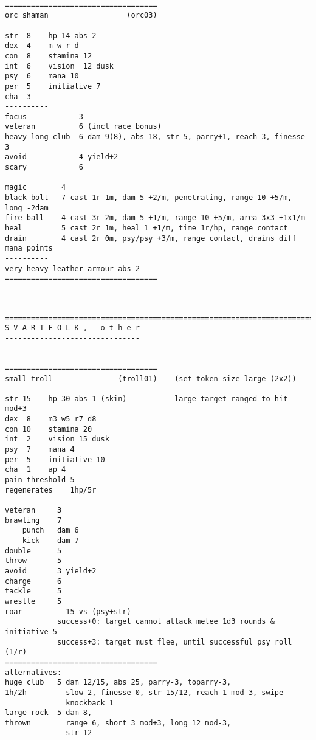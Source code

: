\

\goodbreak \begin{samepage} \small \begin{verbatim}
===================================
orc shaman                  (orc03)
-----------------------------------
str  8    hp 14 abs 2
dex  4    m w r d
con  8    stamina 12
int  6    vision  12 dusk
psy  6    mana 10
per  5    initiative 7
cha  3
----------
focus            3
veteran          6 (incl race bonus)
heavy long club  6 dam 9(8), abs 18, str 5, parry+1, reach-3, finesse-3
avoid            4 yield+2
scary            6
----------
magic        4
black bolt   7 cast 1r 1m, dam 5 +2/m, penetrating, range 10 +5/m, long -2dam
fire ball    4 cast 3r 2m, dam 5 +1/m, range 10 +5/m, area 3x3 +1x1/m
heal         5 cast 2r 1m, heal 1 +1/m, time 1r/hp, range contact
drain        4 cast 2r 0m, psy/psy +3/m, range contact, drains diff mana points
----------
very heavy leather armour abs 2
===================================
\end{verbatim} \normalsize \end{samepage}

\





\goodbreak
{}

\goodbreak \begin{samepage} \small \begin{verbatim}
================================================================================
S V A R T F O L K ,   o t h e r
-------------------------------


===================================
small troll               (troll01)    (set token size large (2x2))
-----------------------------------
str 15    hp 30 abs 1 (skin)           large target ranged to hit mod+3
dex  8    m3 w5 r7 d8
con 10    stamina 20
int  2    vision 15 dusk
psy  7    mana 4
per  5    initiative 10
cha  1    ap 4
pain threshold 5
regenerates    1hp/5r
----------
veteran     3
brawling    7
    punch   dam 6
    kick    dam 7
double      5
throw       5
avoid       3 yield+2
charge      6
tackle      5
wrestle     5
roar        - 15 vs (psy+str)
            success+0: target cannot attack melee 1d3 rounds & initiative-5
            success+3: target must flee, until successful psy roll (1/r)
===================================
alternatives:
huge club   5 dam 12/15, abs 25, parry-3, toparry-3,
1h/2h         slow-2, finesse-0, str 15/12, reach 1 mod-3, swipe
              knockback 1
large rock  5 dam 8,
thrown        range 6, short 3 mod+3, long 12 mod-3,
              str 12
\end{verbatim} \normalsize \end{samepage}

